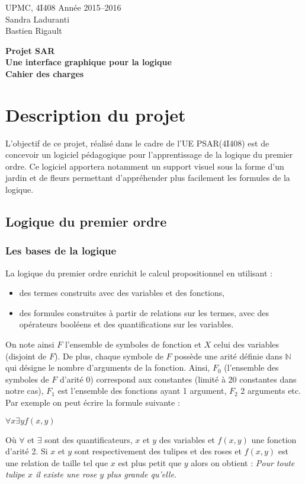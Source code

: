 \documentclass{article}
\newcommand{\N}{\mathbb{N}}
\theoremstyle{plain}
\theoremstyle{remark}
\begin{document}
\noindent UPMC, 4I408 \hfill Année 2015--2016 \\
\hfill Sandra Laduranti \\ Bastien Rigault

\begin{center}
	\vspace{4cm}
 	{ \LARGE \bf
 	Projet SAR \\  Une interface graphique pour la logique 
	\\ \vspace{1cm}
 	Cahier des charges
 	}
\end{center}
\clearpage

\section{Description du projet}
L'objectif de ce projet, réalisé dans le cadre de l'UE PSAR(4I408) est de concevoir un logiciel pédagogique pour l'apprentissage de la logique du premier ordre. Ce logiciel apportera notamment un support visuel sous la forme d'un jardin et de fleurs permettant d'appréhender plus facilement les formules de la logique. 

\subsection{Logique du premier ordre}
\subsubsection{Les bases de la logique}
La logique du premier ordre enrichit le calcul propositionnel en utilisant :
\begin{itemize}
\item des termes construits avec des variables et des fonctions,
\item des formules construites à partir de relations sur les termes,
  avec des opérateurs booléens et des quantifications sur les
  variables.
\end{itemize}
On note ainsi $F$ l'ensemble de symboles de fonction et $X$ celui des variables (disjoint de $F$). De plus, chaque symbole de $F$ possède une arité définie dans $\N$ qui désigne le nombre d'arguments de la fonction. Ainsi, $F_0$ (l'ensemble des symboles de $F$ d'arité 0) correspond aux constantes (limité à 20 constantes dans notre cas), $F_1$ est l'ensemble des fonctions ayant 1 argument, $F_2$ 2 arguments etc.
\newline
Par exemple on peut écrire la formule suivante :
\begin{center}
$ \forall x \exists y f(x,y) $
\end{center}
Où $\forall$ et $\exists$ sont des quantificateurs, $x$ et $y$ des variables et $f(x,y)$ une fonction d'arité 2. Si $x$ et $y$ sont respectivement des tulipes et des roses et $f(x,y)$ est une relation de taille tel que $x$ est plus petit que $y$ alors on obtient : \textit{Pour toute tulipe $x$ il existe une rose $y$ plus grande qu'elle.}
\end{document}
